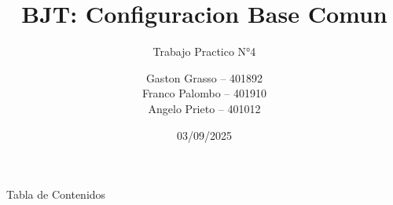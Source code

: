 \documentclass[]{beamer}
\title{BJT: Configuracion Base Comun}
\subtitle{Trabajo Practico N°4}
\author[Grasso, Palombo, Prieto]{%
  \begin{tabular}{l}
      Gaston Grasso -- 401892 \\
    Franco Palombo -- 401910 \\
      Angelo Prieto -- 401012
  \end{tabular}
}
\institute[UTN - FRC]{Universidad Tecnologica Nacional, Facultad Regional Cordoba}
\date[2025]{03/09/2025}
\begin{document}
\frame{\titlepage}
\begin{frame}{Tabla de Contenidos}
\tableofcontents
\end{frame}





\end{document}
